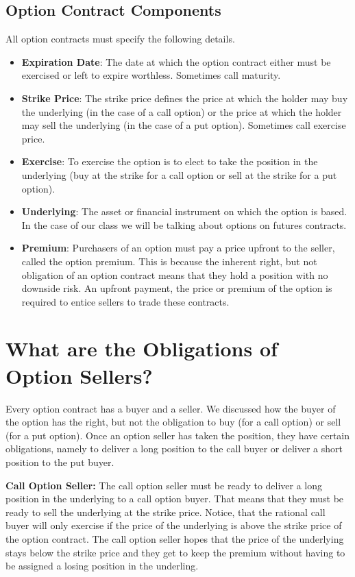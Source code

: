 \documentclass[
  letterpaper,
  DIV=11,
  numbers=noendperiod]{scrreprt}
\begin{document}
\subsection{Option Contract
Components}\label{option-contract-components}

All option contracts must specify the following details.

\begin{itemize}
\item
  \textbf{Expiration Date}: The date at which the option contract either
  must be exercised or left to expire worthless. Sometimes call
  maturity.
\item
  \textbf{Strike Price}: The strike price defines the price at which the
  holder may buy the underlying (in the case of a call option) or the
  price at which the holder may sell the underlying (in the case of a
  put option). Sometimes call exercise price.
\item
  \textbf{Exercise}: To exercise the option is to elect to take the
  position in the underlying (buy at the strike for a call option or
  sell at the strike for a put option).
\item
  \textbf{Underlying}: The asset or financial instrument on which the
  option is based. In the case of our class we will be talking about
  options on futures contracts.
\item
  \textbf{Premium}: Purchasers of an option must pay a price upfront to
  the seller, called the option premium. This is because the inherent
  right, but not obligation of an option contract means that they hold a
  position with no downside risk. An upfront payment, the price or
  premium of the option is required to entice sellers to trade these
  contracts.
\end{itemize}

\section{What are the Obligations of Option
Sellers?}\label{what-are-the-obligations-of-option-sellers}

Every option contract has a buyer and a seller. We discussed how the
buyer of the option has the right, but not the obligation to buy (for a
call option) or sell (for a put option). Once an option seller has taken
the position, they have certain obligations, namely to deliver a long
position to the call buyer or deliver a short position to the put buyer.

\textbf{Call Option Seller:} The call option seller must be ready to
deliver a long position in the underlying to a call option buyer. That
means that they must be ready to sell the underlying at the strike
price. Notice, that the rational call buyer will only exercise if the
price of the underlying is above the strike price of the option
contract. The call option seller hopes that the price of the underlying
stays below the strike price and they get to keep the premium without
having to be assigned a losing position in the underling.
\end{document}
